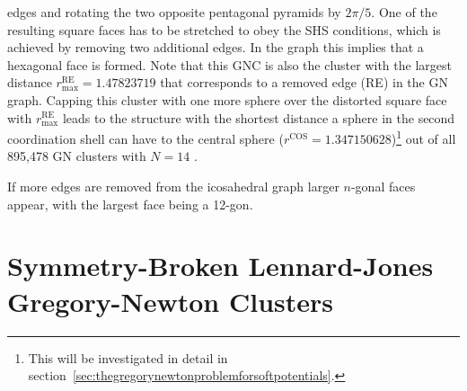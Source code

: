 edges and rotating the two opposite pentagonal pyramids by $2\pi /5$. One of the
resulting square faces has to be stretched to obey the SHS conditions, which is
achieved by removing two additional edges. In the graph this implies that a
hexagonal face is formed. Note that this \ac{GNC} is also the cluster with the
largest distance $r_\mathrm{max}^\mathrm{RE}= 1.47823719$ that corresponds to a
removed edge (RE) in the \ac{GN} graph. Capping this cluster with one more
sphere over the distorted square face with $r_\mathrm{max}^\mathrm{RE}$ leads to
the structure with the shortest distance a sphere in the second coordination
shell can have to the central sphere
($r^\mathrm{COS}=1.347150628$)\footnote{This will be investigated in detail in
section~\ref{sec:thegregorynewtonproblemforsoftpotentials}.} out of all 895,478
\ac{GN} clusters with $N=14$
\autocite{Trombach_stickyhardsphereLennardJonestypeclusters_2018}.

If more edges are removed from the icosahedral graph larger $n$-gonal faces
appear, with the largest face being a 12-gon.
%

\section{Symmetry-Broken Lennard-Jones Gregory-Newton Clusters}


